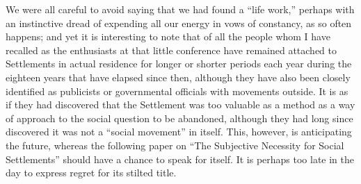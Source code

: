We were all careful to avoid saying that we had found a ``life work,''
perhaps with an instinctive dread of expending all our energy in vows
of constancy, as so often happens; and yet it is interesting to note
that of all the people whom I have  recalled as the
enthusiasts at that little conference have remained attached to
Settlements in actual residence for longer or shorter periods each
year during the eighteen years that have elapsed since then, although
they have also been closely identified as publicists or governmental
officials with movements outside. It is as if they had discovered that
the Settlement was too valuable as a method as a way of approach to
the social question to be abandoned, although they had long since
discovered it was not a ``social movement'' in itself. This, however,
is anticipating the future, whereas the following paper on ``The
Subjective Necessity for Social Settlements'' should have a chance to
speak for itself. It is perhaps too late in the day to express regret
for its stilted title.

